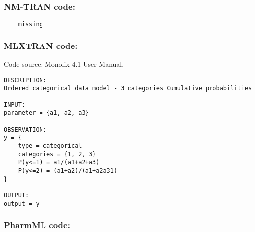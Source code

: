 \subsubsection{NM-TRAN code:}

\myStartLine

\lstset{language=NONMEMdataSet}
\begin{lstlisting}
	missing
\end{lstlisting}

\myEndLine

\subsubsection{MLXTRAN code:}
Code source: Monolix 4.1 User Manual.

\myStartLine

\lstset{language=MLXTRANcode}
\begin{lstlisting}
DESCRIPTION:
Ordered categorical data model - 3 categories Cumulative probabilities

INPUT:
parameter = {a1, a2, a3}

OBSERVATION:
y = { 
	type = categorical 
	categories = {1, 2, 3} 
	P(y<=1) = a1/(a1+a2+a3) 
	P(y<=2) = (a1+a2)/(a1+a2a31) 
}

OUTPUT:
output = y
\end{lstlisting}

\myEndLine

\subsubsection{PharmML code:}

